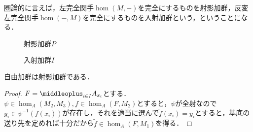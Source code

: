 圏論的に言えば，左完全関手$\hom(M,-)$を完全にするものを射影加群，反変左完全関手$\hom(-,M)$を完全にするものを入射加群という，ということになる．

\begin{minipage}{.45\hsize}
	\begin{figure}[H]
		\centering
		\caption{射影加群$P$}
	\end{figure}
\end{minipage}
\hfill
\begin{minipage}{.45\hsize}
	\begin{figure}[H]
		\centering
		\caption{入射加群$I$}
	\end{figure}
\end{minipage}

\begin{prop}\label{prop:自由加群は射影加群}
	自由加群は射影加群である．
\end{prop}
\begin{proof}
	$F=\middleoplus_{i\in I}A_{x_i}$とする．$\psi\in\hom_A(M_2,M_3),f\in\hom_A(F,M_2)$とすると，$\psi$が全射なので$y_i\in\psi^{-1}(f(x_i))$が存在し，それを適当に選んで$\widetilde{f}(x_i)=y_i$とすると，基底の送り先を定めれば十分だから$\widetilde{f}\in\hom_A(F,M_1)$を得る．
\end{proof}

